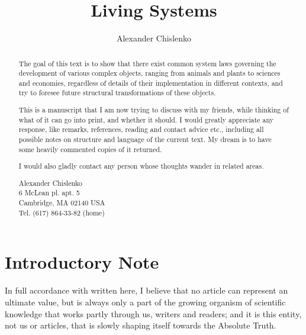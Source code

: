 



\title{Living Systems}
\author{Alexander Chislenko}
\date{}

\maketitle

\begin{abstract}

     The goal of this text is to show that there exist  common  system
laws  governing  the  development  of various complex objects, ranging
from animals and plants  to  sciences  and  economies,  regardless  of
details  of  their  implementation  in  different contexts, and try to
foresee future structural transformations of these objects.

     This is a manuscript that I am now  trying  to  discuss  with  my
friends,  while  thinking of what of it can go into print, and whether
it should.  I would greatly appreciate  any  response,  like  remarks,
references,  reading  and  contact advice etc., including all possible
notes on structure and language of the current text.  My dream  is  to
have some heavily commented copies of it returned.

     I would also gladly contact any person whose thoughts  wander  in
related areas.

{\centering              Alexander Chislenko \\
                         6 McLean pl. apt. 5  \\
                       Cambridge, MA 02140 USA  \\
                     Tel. (617) 864-33-82 (home)  \\}

\end{abstract}

\newpage

\tableofcontents

\newpage

\section{Introductory Note}

     In full accordance with written here, I believe that  no  article
can  represent  an  ultimate  value,  but is always only a part of the
growing organism of scientific knowledge that works partly through us,
writers  and  readers; and it is this entity, not us or articles, that
is slowly shaping itself towards the Absolute Truth.


